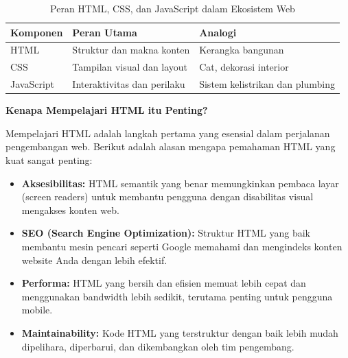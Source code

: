 \begin{table}[htbp]
\centering
\begin{tabular}{|P{3cm}|P{4cm}|P{5cm}|}
\hline
\textbf{Komponen} & \textbf{Peran Utama} & \textbf{Analogi} \\
\hline
HTML & Struktur dan makna konten & Kerangka bangunan \\
\hline
CSS & Tampilan visual dan layout & Cat, dekorasi interior \\
\hline
JavaScript & Interaktivitas dan perilaku & Sistem kelistrikan dan plumbing \\
\hline
\end{tabular}
\caption{Peran HTML, CSS, dan JavaScript dalam Ekosistem Web}
\label{tab:web-triad}
\end{table}

\begin{konsep}
\textbf{Kenapa Mempelajari HTML itu Penting?}

Mempelajari HTML adalah langkah pertama yang esensial dalam perjalanan pengembangan web. Berikut adalah alasan mengapa pemahaman HTML yang kuat sangat penting:

\begin{itemize}[leftmargin=*]
  \item \textbf{Aksesibilitas:} HTML semantik yang benar memungkinkan pembaca layar (screen readers) untuk membantu pengguna dengan disabilitas visual mengakses konten web.
  \item \textbf{SEO (Search Engine Optimization):} Struktur HTML yang baik membantu mesin pencari seperti Google memahami dan mengindeks konten website Anda dengan lebih efektif.
  \item \textbf{Performa:} HTML yang bersih dan efisien memuat lebih cepat dan menggunakan bandwidth lebih sedikit, terutama penting untuk pengguna mobile.
  \item \textbf{Maintainability:} Kode HTML yang terstruktur dengan baik lebih mudah dipelihara, diperbarui, dan dikembangkan oleh tim pengembang.
\end{itemize}
\end{konsep}

